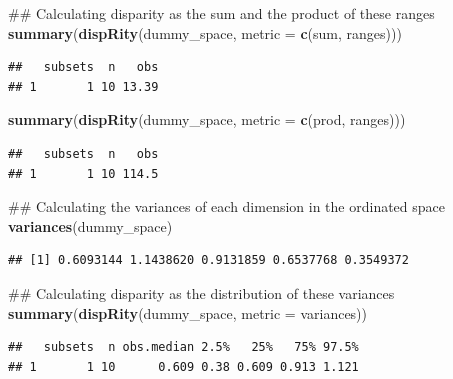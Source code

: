 \documentclass[]{book}
\newenvironment{Shaded}{\begin{snugshade}}{\end{snugshade}}
\newcommand{\KeywordTok}[1]{\textcolor[rgb]{0.13,0.29,0.53}{\textbf{#1}}}
\newcommand{\DataTypeTok}[1]{\textcolor[rgb]{0.13,0.29,0.53}{#1}}
\newcommand{\NormalTok}[1]{#1}
\theoremstyle{definition}
\theoremstyle{definition}
\theoremstyle{remark}
\begin{document}
\begin{Shaded}
\begin{Highlighting}[]
\NormalTok{## Calculating disparity as the sum and the product of these ranges}
\KeywordTok{summary}\NormalTok{(}\KeywordTok{dispRity}\NormalTok{(dummy_space, }\DataTypeTok{metric =} \KeywordTok{c}\NormalTok{(sum, ranges)))}
\end{Highlighting}
\end{Shaded}

\begin{verbatim}
##   subsets  n   obs
## 1       1 10 13.39
\end{verbatim}

\begin{Shaded}
\begin{Highlighting}[]
\KeywordTok{summary}\NormalTok{(}\KeywordTok{dispRity}\NormalTok{(dummy_space, }\DataTypeTok{metric =} \KeywordTok{c}\NormalTok{(prod, ranges)))}
\end{Highlighting}
\end{Shaded}

\begin{verbatim}
##   subsets  n   obs
## 1       1 10 114.5
\end{verbatim}

\begin{Shaded}
\begin{Highlighting}[]
\NormalTok{## Calculating the variances of each dimension in the ordinated space}
\KeywordTok{variances}\NormalTok{(dummy_space)}
\end{Highlighting}
\end{Shaded}

\begin{verbatim}
## [1] 0.6093144 1.1438620 0.9131859 0.6537768 0.3549372
\end{verbatim}

\begin{Shaded}
\begin{Highlighting}[]
\NormalTok{## Calculating disparity as the distribution of these variances}
\KeywordTok{summary}\NormalTok{(}\KeywordTok{dispRity}\NormalTok{(dummy_space, }\DataTypeTok{metric =}\NormalTok{ variances))}
\end{Highlighting}
\end{Shaded}

\begin{verbatim}
##   subsets  n obs.median 2.5%   25%   75% 97.5%
## 1       1 10      0.609 0.38 0.609 0.913 1.121
\end{verbatim}
\end{document}
